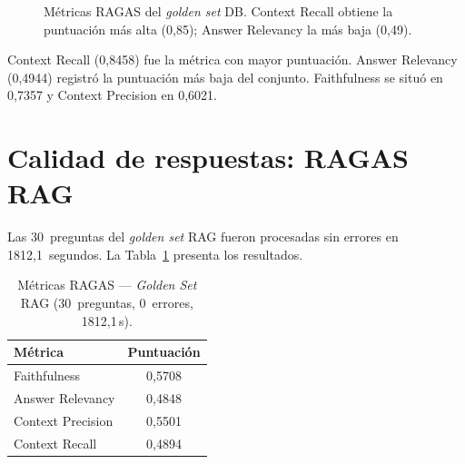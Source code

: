 \begin{figure}[H]
\centering
{}
\caption{Métricas \acs{RAGAS} del \textit{golden set} DB. Context Recall obtiene la puntuación más alta (0,85); Answer Relevancy la más baja (0,49).}
\label{fig:res_ragas_db_barras}
\end{figure}

Context Recall (0,8458) fue la métrica con mayor puntuación. Answer Relevancy (0,4944) registró la puntuación más baja del conjunto. Faithfulness se situó en 0,7357 y Context Precision en 0,6021.


\section{Calidad de respuestas: \acs{RAGAS} RAG}
\label{sec:res_ragas_rag}

Las 30~preguntas del \textit{golden set} \ac{RAG} fueron procesadas sin errores en 1812,1~segundos. La Tabla~\ref{tab:res_ragas_rag} presenta los resultados.

\begin{table}[H]
\centering
\caption{Métricas \acs{RAGAS} --- \textit{Golden Set} \acs{RAG} (30~preguntas, 0~errores, 1812,1\,s).}
\label{tab:res_ragas_rag}
\footnotesize
\begin{tabularx}{\columnwidth}{lc}
\toprule
\textbf{Métrica} & \textbf{Puntuación} \\
\midrule
Faithfulness       & 0,5708 \\
Answer Relevancy   & 0,4848 \\
Context Precision  & 0,5501 \\
Context Recall     & 0,4894 \\
\bottomrule
\end{tabularx}
\end{table}

